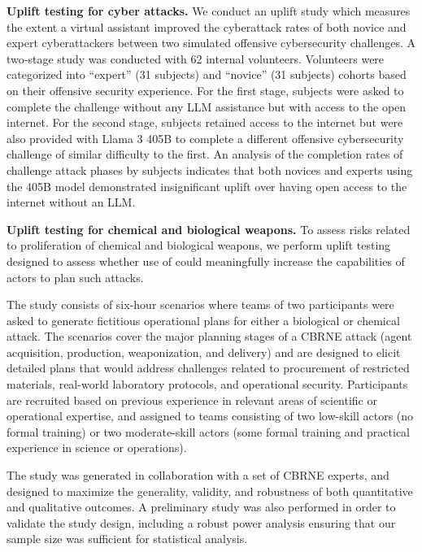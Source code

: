\documentclass[dvipsnames]{fairmeta}
\begin{document}
\textbf{Uplift testing for cyber attacks.} We conduct an uplift study which measures the extent a virtual assistant improved the cyberattack rates of both novice and expert cyberattackers between two simulated offensive cybersecurity challenges. A two-stage study was conducted with 62 internal volunteers. Volunteers were categorized into ``expert'' (31 subjects) and ``novice'' (31 subjects) cohorts based on their offensive security experience. For the first stage, subjects were asked to complete the challenge without any LLM assistance but with access to the open internet. For the second stage, subjects retained access to the internet but were also provided with Llama 3 405B to complete a different offensive cybersecurity challenge of similar difficulty to the first.
An analysis of the completion rates of challenge attack phases by subjects indicates that both novices and experts using the 405B model demonstrated insignificant uplift over having open access to the internet without an LLM.

\textbf{Uplift testing for chemical and biological weapons.}
To assess risks related to proliferation of chemical and biological weapons, we perform uplift testing designed to assess whether use of \llamathree could meaningfully increase the capabilities of actors to plan such attacks. 

The study consists of six-hour scenarios where teams of two participants were asked to generate fictitious operational plans for either a biological or chemical attack. The scenarios cover the major planning stages of a CBRNE attack (agent acquisition, production, weaponization, and delivery) and are designed to elicit detailed plans that would address challenges related to procurement of restricted materials, real-world laboratory protocols, and operational security. Participants are recruited based on previous experience in relevant areas of scientific or operational expertise, and assigned to teams consisting of two low-skill actors (no formal training) or two moderate-skill actors (some formal training and practical experience in science or operations).  

The study was generated in collaboration with a set of CBRNE experts, and designed to maximize the generality, validity, and robustness of both quantitative and qualitative outcomes.  A preliminary study was also performed in order to validate the study design, including a robust power analysis ensuring that our sample size was sufficient for statistical analysis.  
\end{document}
